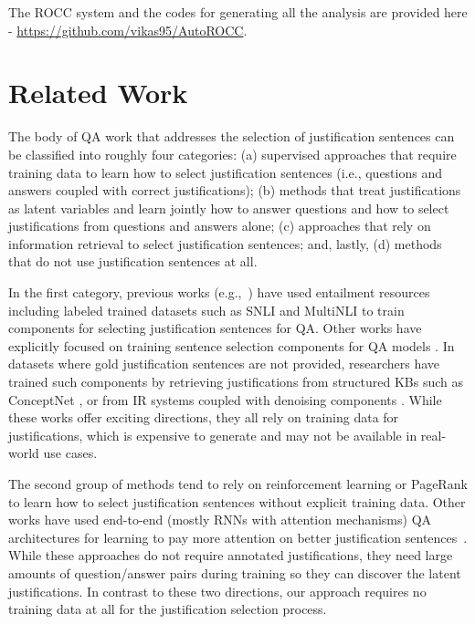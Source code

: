 The ROCC system and the codes for generating all the analysis are provided here - \url{https://github.com/vikas95/AutoROCC}.

\section{Related Work}

The body of QA work that addresses the selection of justification sentences can be classified into roughly four categories: (a) supervised approaches that require training data to learn how to select justification sentences (i.e., questions and answers coupled with correct justifications); (b) methods that treat justifications as latent variables and learn jointly how to answer questions and how to select justifications from questions and answers alone; (c) approaches that rely on information retrieval to select justification sentences; and, lastly, (d) methods that do not use justification sentences at all. 

In the first category, previous works (e.g.,~\cite{trivedi2019repurposing}) have used entailment resources including labeled trained datasets such as  SNLI \cite{bowman2015large} and MultiNLI \cite{williams2017broad} to train components for selecting justification sentences for QA. Other works have explicitly focused on training sentence selection components for QA models \cite{min2018efficient, lin2018denoising, wang2019evidence}. In datasets where gold justification sentences are not provided, researchers have trained such components by retrieving justifications from structured KBs \cite{cui2017kbqa, bao2016constraint, zhang2016joint, hao2017end} such as ConceptNet \cite{speer2017conceptnet}, or from IR systems coupled with denoising components \cite{wang2019evidence}. While these works offer exciting directions, they all rely on training data for justifications, which is expensive to generate and may not be available in real-world use cases.

The second group of methods tend to rely on reinforcement learning \cite{choi2017coarse, lai2018review, geva2018learning} or PageRank \cite{surdeanu2008learning} to learn how to select justification sentences without explicit training data. Other works have used end-to-end (mostly RNNs with attention mechanisms) QA architectures for learning to pay more attention on better justification sentences~\cite{min2018efficient, seo2016bidirectional, yu2014deep, gravina2018cross}. While these approaches do not require annotated justifications, they need large amounts of question/answer pairs during training so they can discover the latent justifications. In contrast to these two directions, our approach requires no training data at all for the justification selection process. 

